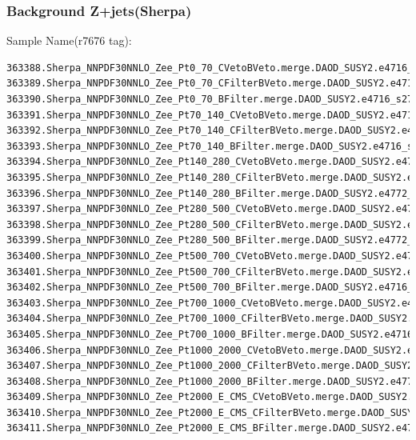 \documentclass[mathserif,serif]{beamer}
\begin{document}
\begin{frame}[fragile]
\frametitle{Background Z+jets(Sherpa)}
\small
Sample Name(r7676 tag):
\tiny
\begin{verbatim}
363388.Sherpa_NNPDF30NNLO_Zee_Pt0_70_CVetoBVeto.merge.DAOD_SUSY2.e4716_s2726_r7725_r7676_p2666/
363389.Sherpa_NNPDF30NNLO_Zee_Pt0_70_CFilterBVeto.merge.DAOD_SUSY2.e4716_s2726_r7725_r7676_p2666/
363390.Sherpa_NNPDF30NNLO_Zee_Pt0_70_BFilter.merge.DAOD_SUSY2.e4716_s2726_r7725_r7676_p2666/
363391.Sherpa_NNPDF30NNLO_Zee_Pt70_140_CVetoBVeto.merge.DAOD_SUSY2.e4716_s2726_r7725_r7676_p2666/
363392.Sherpa_NNPDF30NNLO_Zee_Pt70_140_CFilterBVeto.merge.DAOD_SUSY2.e4772_s2726_r7725_r7676_p2666/
363393.Sherpa_NNPDF30NNLO_Zee_Pt70_140_BFilter.merge.DAOD_SUSY2.e4716_s2726_r7725_r7676_p2666/
363394.Sherpa_NNPDF30NNLO_Zee_Pt140_280_CVetoBVeto.merge.DAOD_SUSY2.e4716_s2726_r7725_r7676_p2666/
363395.Sherpa_NNPDF30NNLO_Zee_Pt140_280_CFilterBVeto.merge.DAOD_SUSY2.e4716_s2726_r7725_r7676_p2666/
363396.Sherpa_NNPDF30NNLO_Zee_Pt140_280_BFilter.merge.DAOD_SUSY2.e4772_s2726_r7725_r7676_p2666/
363397.Sherpa_NNPDF30NNLO_Zee_Pt280_500_CVetoBVeto.merge.DAOD_SUSY2.e4716_s2726_r7725_r7676_p2666/
363398.Sherpa_NNPDF30NNLO_Zee_Pt280_500_CFilterBVeto.merge.DAOD_SUSY2.e4716_s2726_r7725_r7676_p2666/
363399.Sherpa_NNPDF30NNLO_Zee_Pt280_500_BFilter.merge.DAOD_SUSY2.e4772_s2726_r7725_r7676_p2666/
363400.Sherpa_NNPDF30NNLO_Zee_Pt500_700_CVetoBVeto.merge.DAOD_SUSY2.e4716_s2726_r7725_r7676_p2666/
363401.Sherpa_NNPDF30NNLO_Zee_Pt500_700_CFilterBVeto.merge.DAOD_SUSY2.e4716_s2726_r7725_r7676_p2666/
363402.Sherpa_NNPDF30NNLO_Zee_Pt500_700_BFilter.merge.DAOD_SUSY2.e4716_s2726_r7725_r7676_p2666/
363403.Sherpa_NNPDF30NNLO_Zee_Pt700_1000_CVetoBVeto.merge.DAOD_SUSY2.e4716_s2726_r7725_r7676_p2666/
363404.Sherpa_NNPDF30NNLO_Zee_Pt700_1000_CFilterBVeto.merge.DAOD_SUSY2.e4716_s2726_r7725_r7676_p2666/
363405.Sherpa_NNPDF30NNLO_Zee_Pt700_1000_BFilter.merge.DAOD_SUSY2.e4716_s2726_r7725_r7676_p2666/
363406.Sherpa_NNPDF30NNLO_Zee_Pt1000_2000_CVetoBVeto.merge.DAOD_SUSY2.e4716_s2726_r7725_r7676_p2666/
363407.Sherpa_NNPDF30NNLO_Zee_Pt1000_2000_CFilterBVeto.merge.DAOD_SUSY2.e4716_s2726_r7725_r7676_p2666/
363408.Sherpa_NNPDF30NNLO_Zee_Pt1000_2000_BFilter.merge.DAOD_SUSY2.e4772_s2726_r7725_r7676_p2666/
363409.Sherpa_NNPDF30NNLO_Zee_Pt2000_E_CMS_CVetoBVeto.merge.DAOD_SUSY2.e4716_s2726_r7725_r7676_p2666/
363410.Sherpa_NNPDF30NNLO_Zee_Pt2000_E_CMS_CFilterBVeto.merge.DAOD_SUSY2.e4716_s2726_r7725_r7676_p2666/
363411.Sherpa_NNPDF30NNLO_Zee_Pt2000_E_CMS_BFilter.merge.DAOD_SUSY2.e4772_s2726_r7725_r7676_p2666/
\end{verbatim}
\end{frame}
\end{document}
